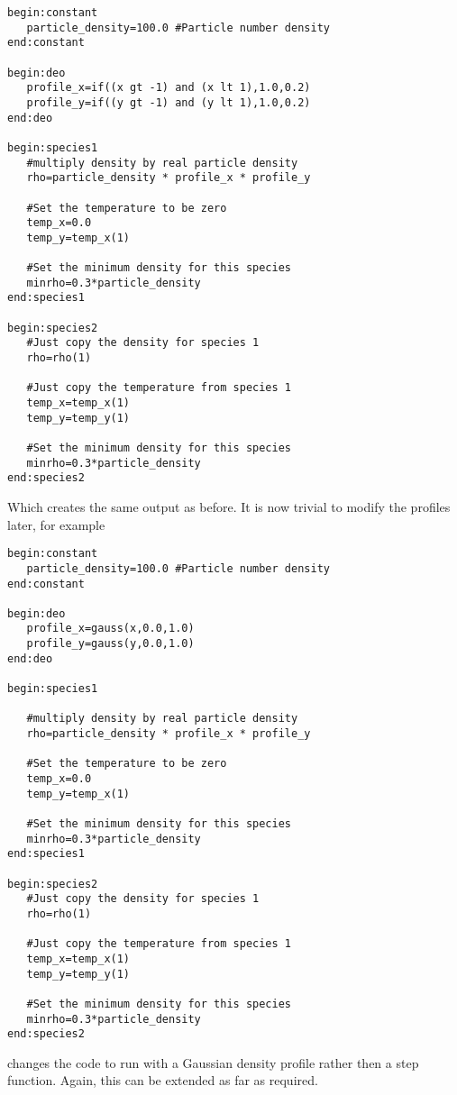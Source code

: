 \documentclass[12pt,a4paper]{article}
\newcommand{\simpleboxverbatim}{\begin{Verbatim}[obeytabs=true,frame=single,
  framerule=0.5mm,rulecolor=\color{warwickmid},formatcom=\color{black}]}
\begin{document}
\simpleboxverbatim
begin:constant
   particle_density=100.0 #Particle number density
end:constant

begin:deo
   profile_x=if((x gt -1) and (x lt 1),1.0,0.2)
   profile_y=if((y gt -1) and (y lt 1),1.0,0.2)
end:deo

begin:species1
   #multiply density by real particle density
   rho=particle_density * profile_x * profile_y

   #Set the temperature to be zero
   temp_x=0.0
   temp_y=temp_x(1)

   #Set the minimum density for this species
   minrho=0.3*particle_density
end:species1

begin:species2
   #Just copy the density for species 1
   rho=rho(1)

   #Just copy the temperature from species 1
   temp_x=temp_x(1)
   temp_y=temp_y(1)

   #Set the minimum density for this species
   minrho=0.3*particle_density
end:species2
\end{Verbatim}

Which creates the same output as before. It is now trivial to modify the profiles later, for example

\simpleboxverbatim
begin:constant
   particle_density=100.0 #Particle number density
end:constant

begin:deo
   profile_x=gauss(x,0.0,1.0)
   profile_y=gauss(y,0.0,1.0)
end:deo

begin:species1

   #multiply density by real particle density
   rho=particle_density * profile_x * profile_y

   #Set the temperature to be zero
   temp_x=0.0
   temp_y=temp_x(1)

   #Set the minimum density for this species
   minrho=0.3*particle_density
end:species1

begin:species2
   #Just copy the density for species 1
   rho=rho(1)

   #Just copy the temperature from species 1
   temp_x=temp_x(1)
   temp_y=temp_y(1)

   #Set the minimum density for this species
   minrho=0.3*particle_density
end:species2
\end{Verbatim}

changes the code to run with a Gaussian density profile rather then a step
function. Again, this can be extended as far as required.
\end{document}

